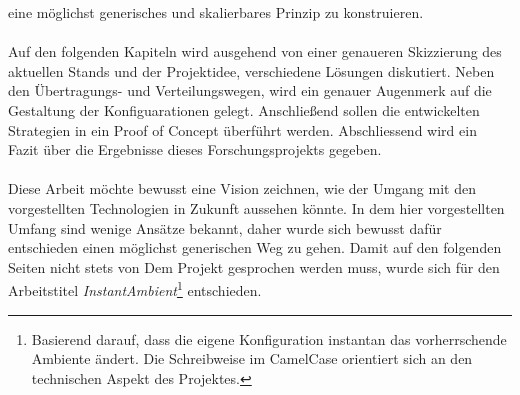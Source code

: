 eine möglichst generisches und skalierbares Prinzip zu konstruieren. 
\\\\
Auf den folgenden Kapiteln wird ausgehend von einer genaueren Skizzierung des aktuellen Stands und der Projektidee, verschiedene Lösungen diskutiert. Neben den Übertragungs- 
und Verteilungswegen, wird ein genauer Augenmerk auf die Gestaltung der Konfiguarationen gelegt. Anschließend sollen die entwickelten Strategien in ein Proof of Concept 
überführt werden. Abschliessend wird ein Fazit über die Ergebnisse dieses Forschungsprojekts gegeben. 
\\\\
Diese Arbeit möchte bewusst eine Vision zeichnen, wie der Umgang mit den vorgestellten Technologien in Zukunft aussehen könnte. In dem hier vorgestellten Umfang sind wenige
Ansätze bekannt, daher wurde sich bewusst dafür entschieden einen möglichst generischen Weg zu gehen. Damit auf den folgenden Seiten nicht stets von \glqq Dem Projekt\grqq 
gesprochen werden muss, wurde sich für den Arbeitstitel \emph{InstantAmbient}\footnote{Basierend darauf, dass die eigene Konfiguration instantan das vorherrschende Ambiente 
ändert. Die Schreibweise im CamelCase orientiert sich an den technischen Aspekt des Projektes.} entschieden.

